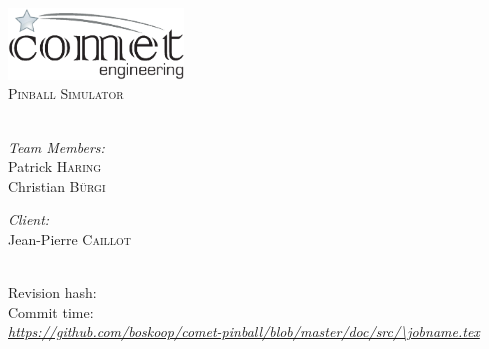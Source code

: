 % 
% 
% 
%
%
% 
%

\begin{titlepage}

\begin{center}

\includegraphics[width=0.35\textwidth]{./comet-logo.eps}\\[2.5cm]    

\textsc{\Large Pinball Simulator}\\[2cm]

{ \huge \bfseries \doctitle{}}\\[3cm]

\begin{minipage}{0.45\textwidth}
\begin{flushleft} \large
\emph{Team Members:}\\
Patrick \textsc{Haring}\\
Christian \textsc{Bürgi}
\end{flushleft}
\end{minipage}
\begin{minipage}{0.45\textwidth}
\begin{flushright} \large
\emph{Client:} \\
Jean-Pierre \textsc{Caillot}\\
~
\end{flushright}
\end{minipage}

\vfill

{\large 
Revision hash: \gitAbbrevHash \\[0.2cm]
Commit time: \gitCommitterIsoDate \\[0.2cm]
{\footnotesize \itshape \url{https://github.com/boskoop/comet-pinball/blob/master/doc/src/\jobname.tex}}}

\end{center}

\end{titlepage}